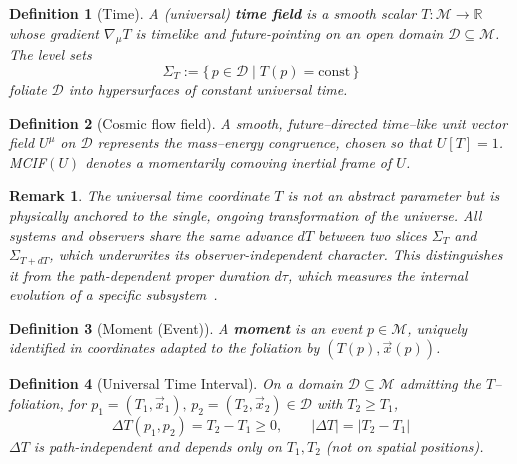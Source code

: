 \documentclass[12pt]{article}
\newtheorem{definition}{Definition}
\theoremstyle{plain} %
\newtheorem{remark}{Remark}
\begin{document}
\begin{definition}[Time]
A (universal) \textbf{time field} is a smooth scalar $T:\mathcal{M}\to\mathbb{R}$ whose gradient $\nabla_\mu T$ is timelike and future-pointing on an open domain $\mathcal{D}\subseteq\mathcal{M}$. The level sets
\begin{equation}
\Sigma_T := \{\, p \in \mathcal{D} \mid T(p)=\mathrm{const}\,\}
\label{eq:SigmaT}
\end{equation}
foliate $\mathcal{D}$ into hypersurfaces of constant universal time.
\end{definition}

\begin{definition}[Cosmic flow field]
A smooth, future–directed time–like unit vector field $U^\mu$ on $\mathcal{D}$ represents the mass–energy congruence, chosen so that $U[T]=1$. MCIF$(U)$ denotes a momentarily comoving inertial frame of $U$.
\end{definition}

\begin{remark}
The universal time coordinate $T$ is not an abstract parameter but is physically anchored to the single, ongoing transformation of the universe. All systems and observers share the same advance $dT$ between two slices $\Sigma_{T}$ and $\Sigma_{T+dT}$, which underwrites its observer-independent character. This distinguishes it from the path-dependent proper duration $d\tau$, which measures the internal evolution of a specific subsystem~\cite{lorentz1952}.
\end{remark}

\begin{definition}[Moment (Event)]
A \textbf{moment} is an event $p\in\mathcal{M}$, uniquely identified in coordinates adapted to the foliation by $(T(p),\vec{x}(p))$.
\end{definition}

\begin{definition}[Universal Time Interval]
On a domain $\mathcal{D}\subseteq\mathcal{M}$ admitting the $T$–foliation, for $p_1=(T_1,\vec{x}_1),\,p_2=(T_2,\vec{x}_2)\in\mathcal{D}$ with $T_2\ge T_1$,
\begin{equation}
\Delta T(p_1,p_2)=T_2-T_1\ge 0,\qquad |\Delta T|=|T_2-T_1|
\label{eq:DeltaT}
\end{equation}
$\Delta T$ is path-independent and depends only on $T_1,T_2$ (not on spatial positions).
\end{definition}
\end{document}
